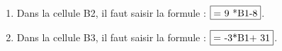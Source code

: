 
\medskip

%
%
%
%

	\begin{enumerate}
		\item %
Dans la cellule B2, il faut saisir la formule : $\fbox{= 9 *\text{}B1-8}$.
		\item %
Dans la cellule B3, il faut saisir la formule :
$\fbox{= -3*\text{B}1+ 31}$.
	\end{enumerate}
	
